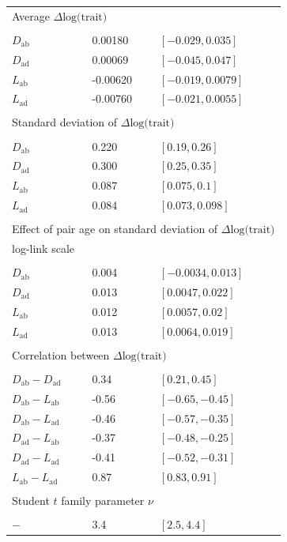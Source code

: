 \documentclass[
  12pt,
]{article}
\begin{document}
\begin{table}[ht]
\begin{center}
\begin{tabular}{lll}
  \multicolumn{3}{l}{Average $\Delta \text{log(trait)}$} \\
  \\
  $D_\mathrm{ab}$ &  0.00180  & $[-0.029,0.035]$  \\
  $D_\mathrm{ad}$ &  0.00069  & $[-0.045,0.047]$  \\
  $L_\mathrm{ab}$ & -0.00620  & $[-0.019,0.0079]$  \\
  $L_\mathrm{ad}$ & -0.00760  & $[-0.021,0.0055]$  \\
  \\
  \multicolumn{3}{l}{Standard deviation of $\Delta \text{log(trait)}$} \\
  \\
  $D_\mathrm{ab}$ & 0.220  & $[0.19,0.26]$  \\
  $D_\mathrm{ad}$ & 0.300  & $[0.25,0.35]$  \\
  $L_\mathrm{ab}$ & 0.087  & $[0.075,0.1]$  \\
  $L_\mathrm{ad}$ & 0.084  & $[0.073,0.098]$  \\
  \\
  \multicolumn{3}{l}{Effect of pair age on standard deviation of $\Delta \text{log(trait)}$} \\
  \multicolumn{3}{l}{log-link scale} \\
  \\
  $D_\mathrm{ab}$ & 0.004  & $[-0.0034,0.013]$  \\
  $D_\mathrm{ad}$ & 0.013  & $[0.0047,0.022]$  \\
  $L_\mathrm{ab}$ & 0.012  & $[0.0057,0.02]$  \\
  $L_\mathrm{ad}$ & 0.013  & $[0.0064,0.019]$  \\
  \\
  \multicolumn{3}{l}{Correlation between $\Delta \text{log(trait)}$} \\
  \\
  $D_\mathrm{ab}-D_\mathrm{ad}$ & 
   0.34  & $[0.21,0.45]$  \\
  $D_\mathrm{ab}-L_\mathrm{ab}$ & 
  -0.56  & $[-0.65,-0.45]$  \\
  $D_\mathrm{ab}-L_\mathrm{ad}$ & 
  -0.46  & $[-0.57,-0.35]$  \\
  $D_\mathrm{ad}-L_\mathrm{ab}$ & 
  -0.37  & $[-0.48,-0.25]$  \\
  $D_\mathrm{ad}-L_\mathrm{ad}$ & 
  -0.41  & $[-0.52,-0.31]$  \\
  $L_\mathrm{ab}-L_\mathrm{ad}$ & 
   0.87  & $[0.83,0.91]$  \\
  \\
  \multicolumn{3}{l}{Student $t$ family parameter $\nu$} \\
  \\
  $-$ & 3.4  & $[2.5,4.4]$  \\

\bottomrule

\end{tabular}
\end{center}
\end{table}
\end{document}
